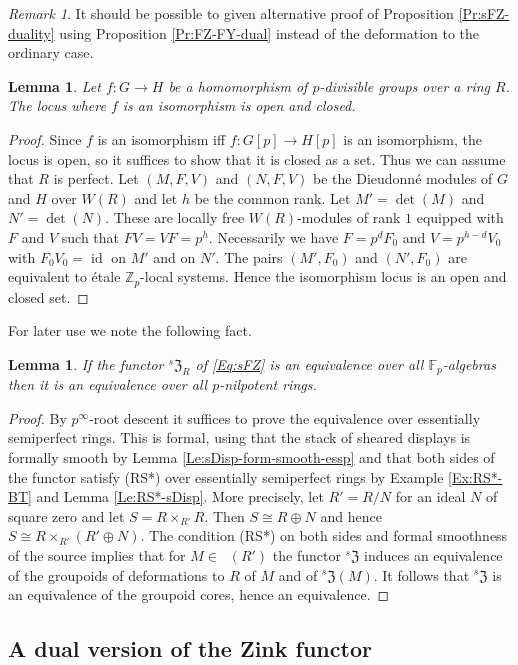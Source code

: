 \documentclass[a4paper,11pt]{amsart}
\theoremstyle{plain}
\newtheorem{Lemma}[equation]{Lemma}
\theoremstyle{definition}
\theoremstyle{remark}
\newtheorem{Remark}[equation]{Remark}
\newcommand{\bLe}{\begin{Lemma}}
\newcommand{\eLe}{\end{Lemma}}
\newcommand{\bRe}{\begin{Remark}}
\newcommand{\eRe}{\end{Remark}}
\newcommand{\bproof}{\begin{proof}}
\newcommand{\eproof}{\end{proof}}
\newcommand{\uM}{M} %
\numberwithin{equation}{section}
\newcommand{\FZ}{\mathfrak{Z}}
\newcommand{\FF}{{\mathbb{F}}}
\newcommand{\ZZ}{{\mathbb{Z}}}
\DeclareMathOperator{\id}{id}
\DeclareMathOperator{\sDisp}{{}^sDisp}
\newcommand{\sFZ}{{}^s\FZ}
\begin{document}
\bRe
\label{Re:Pr-sFZ-duality-alt-proof}
It should be possible to given alternative proof of Proposition \ref{Pr:sFZ-duality} using Proposition \ref{Pr:FZ-FY-dual} instead of the deformation to the ordinary case. 
\eRe

\bLe
\label{Le:Hom-BT-isom-clopen}
Let $f:G\to H$ be a homomorphism of $p$-divisible groups over a ring $R$. The locus where $f$ is an isomorphism is open and closed.
\eLe

\bproof
Since $f$ is an isomorphism iff $f\colon G[p]\to H[p]$ is an isomorphism, the locus is open, so it suffices to show that it is closed as a set. Thus we can assume that $R$ is perfect. Let $(M,F,V)$ and $(N,F,V)$ be the Dieudonn\'e modules of $G$ and $H$ over $W(R)$ and let $h$ be the common rank. Let $M'=\det(M)$ and $N'=\det(N)$. These are locally free $W(R)$-modules of rank $1$ equipped with $F$ and $V$ such that $FV=VF=p^h$. Necessarily we have $F=p^dF_0$ and $V=p^{h-d}V_0$ with $F_0V_0=\id$ on $M'$ and on $N'$. The pairs $(M',F_0)$ and $(N',F_0)$ are equivalent to \'etale $\ZZ_p$-local systems. Hence the isomorphism locus is an open and closed set.
\eproof

For later use we note the following fact.

\bLe
\label{Le:sFZ-eq-Fp-gen}
If the functor\/ $\sFZ_R$ of \eqref{Eq:sFZ} is an equivalence over all\/ $\FF_p$-algebras then it is an equivalence over all $p$-nilpotent rings.
\eLe

\bproof
By $p^\infty$-root descent it suffices to prove the equivalence over essentially semiperfect rings. This is formal, using that the stack of sheared displays is formally smooth by Lemma \ref{Le:sDisp-form-smooth-essp} and that both sides of the functor satisfy (RS*) over essentially semiperfect rings by Example \ref{Ex:RS*-BT} and Lemma \ref{Le:RS*-sDisp}. More precisely, let $R'=R/N$ for an ideal $N$ of square zero and let $S=R\times_{R'}R$. Then $S\cong R\oplus N$ and hence $S\cong R\times_{R'}(R'\oplus N)$. The condition (RS*) on both sides and formal smoothness of the source implies that for $\uM\in\sDisp(R')$ the functor $\sFZ$ induces an equivalence of the groupoids of deformations to $R$ of $\uM$ and of $\sFZ(\uM)$. It follows that $\sFZ$ is an equivalence of the groupoid cores, hence an equivalence.
\eproof

\subsection{A dual version of the Zink functor}
\end{document}
